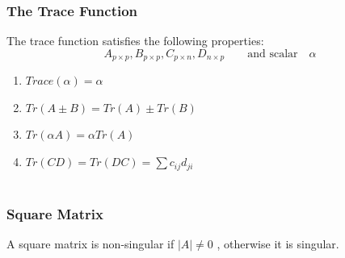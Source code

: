 \documentclass[11pt,a4paper]{article}
\theoremstyle{definition}
\begin{document}
\subsubsection{The Trace Function}

The trace function satisfies the following properties:
$$A_{p\times p},  B_{p\times p},  C_{p\times n},  D_{n\times p}\qquad\text{and scalar}\quad  \alpha$$

\begin{enumerate}
\item $Trace(\alpha) = \alpha$

\item $Tr(A\pm B) = Tr(A) \pm Tr(B)$

\item $Tr(\alpha A) = \alpha Tr(A)$

\item $Tr(CD) = Tr(DC) = \displaystyle{\sum c_{ij}d_{ji}}$\\\\
\end{enumerate}




\pagebreak


\subsubsection{Square Matrix}

A square matrix is non-singular if $|A| \neq 0$ , otherwise it is singular.\\
\end{document}
